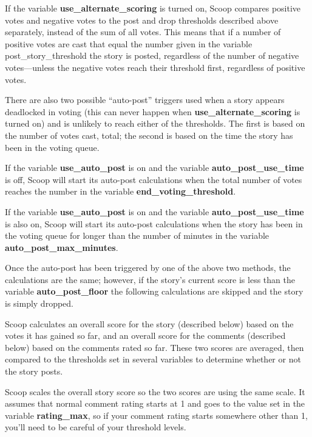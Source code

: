 If the variable {\bf use\_alternate\_scoring} is turned on, Scoop compares positive votes and negative votes to the post and drop thresholds described above separately, instead of the sum of all votes.  This means that if a number of positive votes are cast that equal the number given in the variable post\_story\_threshold the story is posted, regardless of the number of negative votes---unless the negative votes reach their threshold first, regardless of positive votes.

There are also two possible ``auto-post'' triggers used when a story appears deadlocked in voting (this can never happen when {\bf use\_alternate\_scoring} is turned on) and is unlikely to reach either of the thresholds.  The first is based on the number of votes cast, total; the second is based on the time the story has been in the voting queue.

If the variable {\bf use\_auto\_post} is on and the variable {\bf auto\_post\_use\_time} is off, Scoop will start its auto-post calculations when the total number of votes reaches the number in the variable {\bf end\_voting\_threshold}.

If the variable {\bf use\_auto\_post} is on and the variable {\bf auto\_post\_use\_time} is also on, Scoop will start its auto-post calculations when the story has been in the voting queue for longer than the number of minutes in the variable {\bf auto\_post\_max\_minutes}.

Once the auto-post has been triggered by one of the above two methods, the calculations are the same; however, if the story's current score is less than the variable {\bf auto\_post\_floor} the following calculations are skipped and the story is simply dropped.  

Scoop calculates an overall score for the story (described below) based on the votes it has gained so far, and an overall score for the comments (described below) based on the comments rated so far.  These two scores are averaged, then compared to the thresholds set in several variables to determine whether or not the story posts.

Scoop scales the overall story score so the two scores are using the same scale.  It assumes that normal comment rating starts at 1 and goes to the value set in the variable {\bf rating\_max}, so if your comment rating starts somewhere other than 1, you'll need to be careful of your threshold levels.

